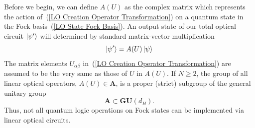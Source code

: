 \documentclass[aps,pra,twocolumn,showpacs,superscriptaddress,floatfix,10pt]{revtex4}
\begin{document}
Before we begin, we can define $A(U)$ as the complex matrix which represents the action of~(\ref{LO Creation Operator Transformation}) on a quantum state in the Fock basis~(\ref{LO State Fock Basis}). An output state of our total optical circuit $\ket{\psi^\prime}$ will determined by standard matrix-vector multiplication
\begin{equation}
\label{Matrix Vector Product}
\ket{\psi^\prime} = A(U) \ket{\psi}
\end{equation}
The matrix elements $U_{\alpha \beta}$ in~(\ref{LO Creation Operator Transformation}) are assumed to be the very same as those of $U$ in $A(U)$. If $N \ge 2$, the group of all linear optical operators, $ A(U) \in \textbf{A}$, is a proper (strict) subgroup of the general unitary group
\begin{equation}
\label{Proper Subgroup}
\textbf{A} \subset \textbf{GU}(d_H).
\end{equation}
Thus, not all quantum logic operations on Fock states can be implemented via linear optical circuits.
\end{document}
